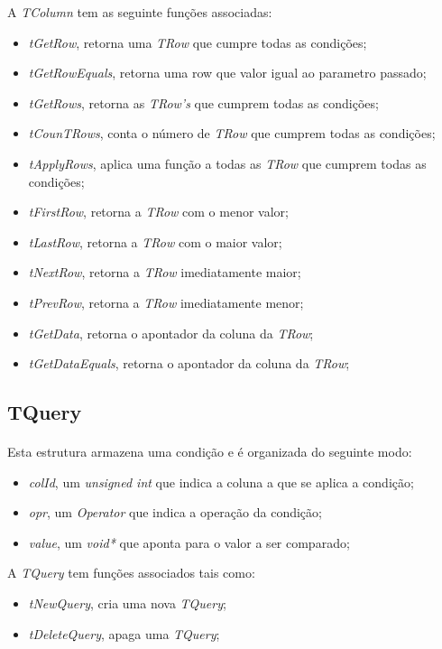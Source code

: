 \documentclass[a4paper, 10pt]{article}
\begin{document}
A \emph{TColumn} tem as seguinte funções associadas:
\begin{itemize}
	\item \emph{tGetRow}, retorna uma \emph{TRow} que cumpre todas as condições;
	\item \emph{tGetRowEquals}, retorna uma row que valor igual ao parametro passado;
	\item \emph{tGetRows}, retorna as \emph{TRow's} que cumprem todas as condições;
	\item \emph{tCounTRows}, conta o número de \emph{TRow} que cumprem todas as condições;
	\item \emph{tApplyRows}, aplica uma função a todas as \emph{TRow} que cumprem todas as condições;
	\item \emph{tFirstRow}, retorna a \emph{TRow} com o menor valor;
	\item \emph{tLastRow}, retorna a \emph{TRow} com o maior valor;
	\item \emph{tNextRow}, retorna a \emph{TRow} imediatamente maior;
	\item \emph{tPrevRow}, retorna a \emph{TRow} imediatamente menor;
	\item \emph{tGetData}, retorna o apontador da coluna da \emph{TRow};
	\item \emph{tGetDataEquals}, retorna o apontador da coluna da \emph{TRow};
\end{itemize}

\subsection{TQuery}
\label{sssec:Query}

\paragraph{ }

Esta estrutura armazena uma condição e é organizada do seguinte modo:
\begin{itemize}
	\item \emph{colId}, um \emph{unsigned int} que indica a coluna a que se aplica a condição;
	\item \emph{opr}, um \emph{Operator} que indica a operação da condição;
	\item \emph{value}, um \emph{void*} que aponta para o valor a ser comparado;
\end{itemize}

A \emph{TQuery} tem funções associados tais como:
\begin{itemize}
	\item \emph{tNewQuery}, cria uma nova \emph{TQuery};
	\item \emph{tDeleteQuery}, apaga uma \emph{TQuery};
\end{itemize}
\end{document}
